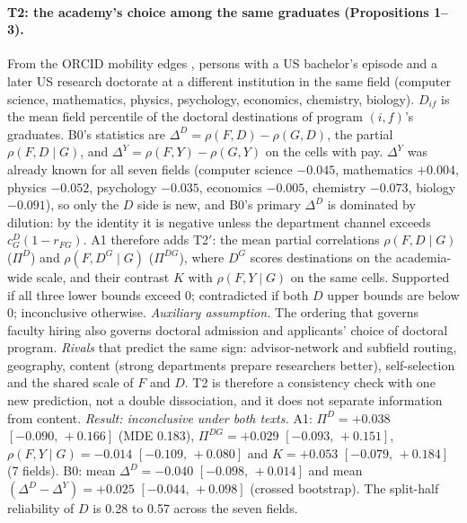 \documentclass[11pt]{article}
\newcommand{\ci}[2]{$[#1,\allowbreak\,#2]$}
\begin{document}
\paragraph{T2: the academy's choice among the same graduates (Propositions 1--3).} From the ORCID mobility edges
\citep{li2026orcid}, persons with a US bachelor's episode and a later US research doctorate at a different
institution in the same field (computer science, mathematics, physics, psychology, economics, chemistry, biology).
$D_{if}$ is the mean field percentile of the doctoral destinations of program $(i,f)$'s graduates. B0's statistics
are $\Delta^D=\rho(F,D)-\rho(G,D)$, the partial $\rho(F,D\mid G)$, and $\Delta^Y=\rho(F,Y)-\rho(G,Y)$ on the cells
with pay. $\Delta^Y$ was already known for all seven fields (computer science $-0.045$, mathematics $+0.004$,
physics $-0.052$, psychology $-0.035$, economics $-0.005$, chemistry $-0.073$, biology $-0.091$), so only the $D$
side is new, and B0's primary $\Delta^D$ is dominated by dilution: by the identity it is negative unless the
department channel exceeds $c^D_G(1-r_{FG})$. A1 therefore adds T2$'$: the mean partial correlations
$\rho(F,D\mid G)$ ($\Pi^D$) and $\rho(F,D^G\mid G)$ ($\Pi^{DG}$), where $D^G$ scores destinations on the
academia-wide scale, and their contrast $K$ with $\rho(F,Y\mid G)$ on the same cells. Supported if all three lower
bounds exceed 0; contradicted if both $D$ upper bounds are below 0; inconclusive otherwise. \emph{Auxiliary
assumption.} The ordering that governs faculty hiring also governs doctoral admission and applicants' choice of
doctoral program. \emph{Rivals} that predict the same sign: advisor-network and subfield routing, geography,
content (strong departments prepare researchers better), self-selection and the shared scale of $F$ and $D$. T2 is
therefore a consistency check with one new prediction, not a double dissociation, and it does not separate
information from content. \emph{Result: inconclusive under both texts.} A1: $\Pi^D=+0.038$ \ci{-0.090}{+0.166}
(MDE 0.183), $\Pi^{DG}=+0.029$ \ci{-0.093}{+0.151}, $\rho(F,Y\mid G)=-0.014$ \ci{-0.109}{+0.080} and $K=+0.053$
\ci{-0.079}{+0.184} (7 fields). B0: mean $\Delta^D=-0.040$ \ci{-0.098}{+0.014} and mean $(\Delta^D-\Delta^Y)=+0.025$
\ci{-0.044}{+0.098} (crossed bootstrap). The split-half reliability of $D$ is 0.28 to 0.57 across the seven fields.
\end{document}

